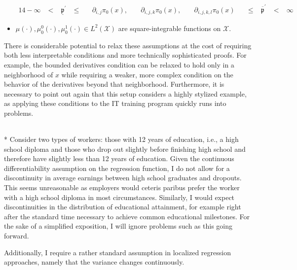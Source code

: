 \begin{boxD}
\begin{asm}
\begin{itemize}
\begin{alignat*}{14}
                -\infty & \; < \; & \underline{\mathfrak{p}}^{\prime} 
                & \; \leq \; && \partial_{i,j} \pi_{0}(x), \; && \partial_{i,j,k} \pi_{0}(x), \; && \partial_{i,j,k,l} \pi_{0}(x)
                && \; \leq \; & \overline{\mathfrak{p}}^{\prime} & \; < \; & \infty
            \end{alignat*}
            \item $\mu(\cdot), \mu_{0}^{0}(\cdot), \mu_{0}^{1}(\cdot) \in L^{2}\left(\mathcal{X}\right)$ are square-integrable functions on $\mathcal{X}$.
		\end{itemize}
	\end{asm}
\end{boxD}
There is considerable potential to relax these assumptions at the cost of requiring both less interpretable conditions and more technically sophisticated proofs. 
For example, the bounded derivatives condition can be relaxed to hold only in a neighborhood of $x$ while requiring a weaker, more complex condition on the behavior of the derivatives beyond that neighborhood.
Furthermore, it is necessary to point out again that this setup considers a highly stylized example, as applying these conditions to the IT training program quickly runs into problems.
\begin{boxE}
    \addtocounter{exmp}{-1}
    \begin{exmp}\mbox{}\\*
        Consider two types of workers: those with 12 years of education, i.e., a high school diploma and those who drop out slightly before finishing high school and therefore have slightly less than 12 years of education.
        Given the continuous differentiability assumption on the regression function, I do not allow for a discontinuity in average earnings between high school graduates and dropouts.
        This seems unreasonable as employers would ceteris paribus prefer the worker with a high school diploma in most circumstances.
        Similarly, I would expect discontinuities in the distribution of educational attainment, for example right after the standard time necessary to achieve common educational milestones.
        For the sake of a simplified exposition, I will ignore problems such as this going forward.
    \end{exmp}    
\end{boxE}
Additionally, I require a rather standard assumption in localized regression approaches, namely that the variance changes continuously.
